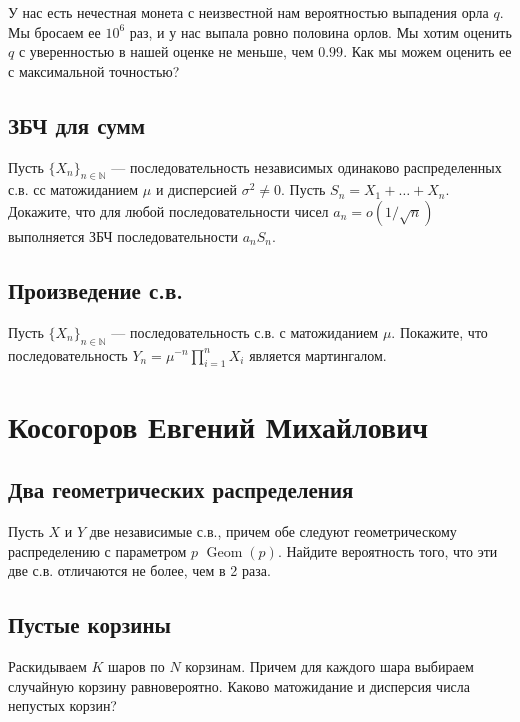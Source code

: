\documentclass[12pt]{article}
\newcommand\N{\mathbb{N}}
\DeclareMathOperator{\Geom}{Geom}
\begin{document}
У нас есть нечестная монета с неизвестной нам вероятностью выпадения орла $q$. Мы бросаем ее $10^6$ раз, и у нас выпала ровно половина орлов. Мы хотим оценить $q$ с уверенностью в нашей оценке не меньше, чем $0.99$. Как мы можем оценить ее с максимальной точностью? 



\subsection{ЗБЧ для сумм}
Пусть $\{X_n\}_{n \in \N}$ --- последовательность независимых одинаково распределенных с.в. сс матожиданием $\mu$ и дисперсией $\sigma^2 \ne 0$. Пусть $S_n = X_1 + \dots + X_n$. Докажите, что для любой последовательности чисел $a_n = o(1/\sqrt{n})$ выполняется ЗБЧ последовательности $a_n S_n$.



\subsection{Произведение с.в.}

Пусть $\{X_n\}_{n \in \N}$ --- последовательность с.в. с матожиданием $\mu$. Покажите, что последовательность $Y_n = \mu^{-n} \prod_{i = 1}^n X_i$ является мартингалом.



\newpage
\section{Косогоров Евгений Михайлович}

\subsection{Два геометрических распределения}

Пусть $X$ и $Y$ две независимые с.в., причем обе следуют геометрическому распределению с параметром $p$ $\Geom(p)$. Найдите вероятность того, что эти две с.в. отличаются не более, чем в 2 раза.



\subsection{Пустые корзины}

Раскидываем $K$ шаров по $N$ корзинам. Причем для каждого шара выбираем случайную корзину равновероятно. Каково матожидание и дисперсия числа непустых корзин?
\end{document}
